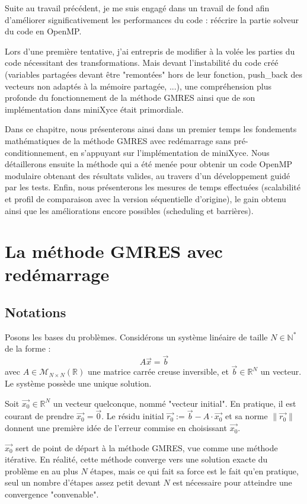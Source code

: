 \documentclass[11pt,a4paper,oneside]{memoir}
\newcommand{\R}{\mathbb{R}}	\newcommand{\Q}{\mathbb{Q}}	\newcommand{\C}{\mathbb{C}}
\newcommand{\N}{\mathbb{N}}	\newcommand{\Z}{\mathbb{Z}}
\theoremstyle{definition}
\theoremstyle{remark}
\theoremstyle{plain}
\begin{document}
Suite au travail précédent, je me suis engagé dans un travail de fond afin d'améliorer significativement les performances du code : réécrire la partie solveur du code en OpenMP.

Lors d'une première tentative, j'ai entrepris de modifier à la volée les parties du code nécessitant des transformations. Mais devant l'instabilité du code créé (variables partagées devant être "remontées" hors de leur fonction, push\_back des vecteurs non adaptés à la mémoire partagée, ...), une compréhension plus profonde du fonctionnement de la méthode GMRES ainsi que de son implémentation dans miniXyce était primordiale.

Dans ce chapitre, nous présenterons ainsi dans un premier temps les fondements mathématiques de la méthode GMRES avec redémarrage sans pré-conditionnement, en s'appuyant sur l'implémentation de miniXyce. Nous détaillerons ensuite la méthode qui a été menée pour obtenir un code OpenMP modulaire obtenant des résultats valides, au travers d'un développement guidé par les tests. Enfin, nous présenterons les mesures de temps effectuées (scalabilité et profil de comparaison avec la version séquentielle d'origine), le gain obtenu ainsi que les améliorations encore possibles (scheduling et barrières).


\section{La méthode GMRES avec redémarrage}

\subsection{Notations}

Posons les bases du problèmes. Considérons un système linéaire de taille $N \in \N^*$ de la forme :
\[
A\vec{x} = \vec{b}
\]
avec $A \in \mathcal{M}_{N \times N}(\R)$ une matrice carrée creuse inversible, et $\vec{b} \in \R^N$ un vecteur. Le système possède une unique solution.\medskip

Soit $\vec{x_0} \in \R^N$ un vecteur quelconque, nommé "vecteur initial". En pratique, il est courant de prendre $\vec{x_0} = \vec{0}$. Le résidu initial $\vec{r_0} := \vec{b} - A \cdot \vec{x_0}$ et sa norme $\lVert \vec{r_0} \rVert$ donnent une première idée de l'erreur commise en choisissant $\vec{x_0}$.

$\vec{x_0}$ sert de point de départ à la méthode GMRES, vue comme une méthode itérative. En réalité, cette méthode converge vers une solution exacte du problème en au plus $N$ étapes, mais ce qui fait sa force est le fait qu'en pratique, seul un nombre d'étapes assez petit devant $N$ est nécessaire pour atteindre une convergence "convenable".\medskip
\end{document}
